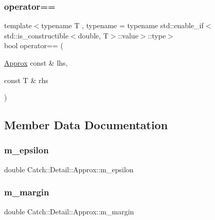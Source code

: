 \subsubsection{\texorpdfstring{operator==}{operator==}\hspace{0.1cm}{\footnotesize\ttfamily [2/2]}}
{\footnotesize\ttfamily template$<$typename T , typename  = typename std\+::enable\+\_\+if$<$std\+::is\+\_\+constructible$<$double, T$>$\+::value$>$\+::type$>$ \\
bool operator== (\begin{DoxyParamCaption}\item[{\mbox{\hyperlink{class_catch_1_1_detail_1_1_approx}{Approx}} const \&}]{lhs,  }\item[{const T \&}]{rhs }\end{DoxyParamCaption})\hspace{0.3cm}{\ttfamily [friend]}}



\subsection{Member Data Documentation}
\mbox{\label{class_catch_1_1_detail_1_1_approx_af17c8e869ae7a55d14b99eb18e178114}} 
\subsubsection{\texorpdfstring{m\_epsilon}{m\_epsilon}}
{\footnotesize\ttfamily double Catch\+::\+Detail\+::\+Approx\+::m\+\_\+epsilon\hspace{0.3cm}{\ttfamily [private]}}

\mbox{\label{class_catch_1_1_detail_1_1_approx_a4262a7e821eec507b424c335121ea0d8}} 
\subsubsection{\texorpdfstring{m\_margin}{m\_margin}}
{\footnotesize\ttfamily double Catch\+::\+Detail\+::\+Approx\+::m\+\_\+margin\hspace{0.3cm}{\ttfamily [private]}}

